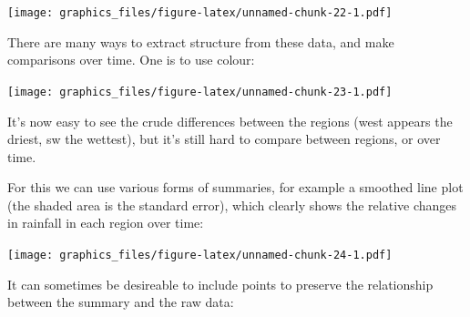 \documentclass[]{article}
\newenvironment{Shaded}{\begin{snugshade}}{\end{snugshade}}
\newcommand{\DataTypeTok}[1]{\textcolor[rgb]{0.13,0.29,0.53}{#1}}
\newcommand{\DecValTok}[1]{\textcolor[rgb]{0.00,0.00,0.81}{#1}}
\newcommand{\KeywordTok}[1]{\textcolor[rgb]{0.13,0.29,0.53}{\textbf{#1}}}
\newcommand{\NormalTok}[1]{#1}
\newcommand{\OperatorTok}[1]{\textcolor[rgb]{0.81,0.36,0.00}{\textbf{#1}}}
\newcommand{\StringTok}[1]{\textcolor[rgb]{0.31,0.60,0.02}{#1}}
\begin{document}
\texttt{[image: graphics\_files/figure-latex/unnamed-chunk-22-1.pdf]}

There are many ways to extract structure from these data, and make comparisons
over time. One is to use colour:

\begin{Shaded}
\end{Shaded}

\texttt{[image: graphics\_files/figure-latex/unnamed-chunk-23-1.pdf]}

It's now easy to see the crude differences between the regions (west appears the
driest, sw the wettest), but it's still hard to compare between regions, or over
time.

For this we can use various forms of summaries, for example a smoothed line plot
(the shaded area is the standard error), which clearly shows the relative
changes in rainfall in each region over time:

\begin{Shaded}
\end{Shaded}

\texttt{[image: graphics\_files/figure-latex/unnamed-chunk-24-1.pdf]}

It can sometimes be desireable to include points to preserve the relationship
between the summary and the raw data:

\begin{Shaded}
\end{Shaded}
\end{document}
